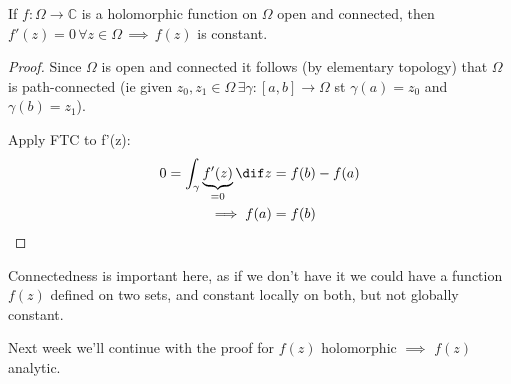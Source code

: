 \begin{corollary}
If $f:\Omega \rightarrow \mathbb{C}$ is a holomorphic function on $\Omega$ open and connected, then $f'(z)=0 \, \forall z \in \Omega \, \implies \, f(z)$ is constant.
\end{corollary}

\begin{proof}
Since $\Omega$ is open and connected it follows (by elementary topology) that $\Omega$ is path-connected (ie given $z_0,z_1 \in \Omega \, \exists \gamma:[a,b] \rightarrow \Omega$ st $ \gamma(a) = z_0$ and $\gamma(b) = z_1$).

Apply FTC to f'(z):
\begin{align*}
    0 = \int_\gamma \underbrace{f'(z)}_{=0}  \dif z &= f(b) - f(a)\\
    \implies f(a) &= f(b)
\end{align*}
\end{proof}
\begin{remark}
Connectedness is important here, as if we don't have it we could have a function $f(z)$ defined on two sets, and constant locally on both, but not globally constant.
\end{remark}

Next week we'll continue with the proof for $f(z)$ holomorphic $\implies$ $f(z)$ analytic.
